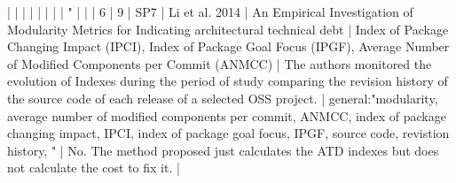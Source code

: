 |    |            |      |                                                                      |                                                                                                                                                                          |                                                                                                                                                                                                                                                            |                                                                                                                                                                                                                                                                      | "                                                                                                                                                                                                                                                                                                        |                                                                                                                                                                                                                                                                                                                                                                                                                                                                                              |
|  6 |          9 | SP7  | Li et al. 2014                                                       | An  Empirical Investigation of Modularity Metrics for Indicating architectural technical debt                                                                            | Index of Package Changing Impact (IPCI),  Index of Package Goal Focus (IPGF), Average Number of Modified Components per Commit (ANMCC)                                                                                                                   | The authors monitored the evolution of Indexes during the period of study comparing the revision history of the source code of each release of a selected OSS project.                                                                                             | general:"modularity, average number of modified components per commit, ANMCC, index of package changing impact, IPCI, index of package goal focus,  IPGF, source code, revistion history, "                                                                                                              | No. The method proposed just calculates the ATD indexes but does not calculate the cost to fix it.                                                                                                                                                                                                                                                                                                                                                                                       |

